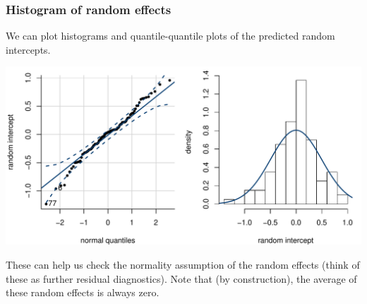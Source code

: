 \documentclass{beamer}
\begin{document}
% 
% 
\begin{frame}
\frametitle{Histogram of random effects}
We can plot histograms and quantile-quantile plots of the predicted random intercepts.
\begin{center}
\includegraphics[width = 0.8 \linewidth]{img/c6/07-mixed-diagran.pdf}
\end{center}
These can help us check the normality assumption of the random effects (think of these as further residual diagnostics). Note that (by construction), the average of these random effects is always zero.
\end{frame}

% 
\end{document}
